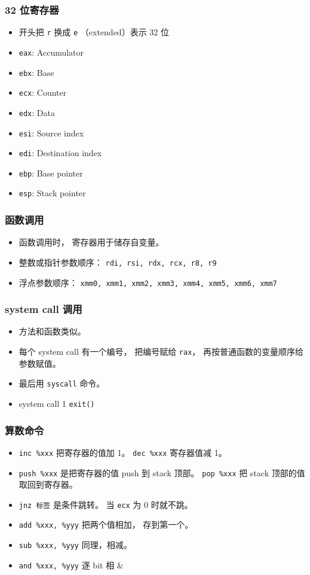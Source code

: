 \subsubsection{32 位寄存器}
\begin{itemize}
\item 开头把 \verb|r| 换成 \verb|e| （extended）表示 32 位
\item \verb|eax|: Accumulator
\item \verb|ebx|: Base
\item \verb|ecx|: Counter
\item \verb|edx|: Data
\item \verb|esi|: Source index
\item \verb|edi|: Destination index
\item \verb|ebp|: Base pointer
\item \verb|esp|: Stack pointer
\end{itemize}

\subsubsection{函数调用}
\begin{itemize}
\item 函数调用时， 寄存器用于储存自变量。
\item 整数或指针参数顺序： \verb|rdi, rsi, rdx, rcx, r8, r9|
\item 浮点参数顺序： \verb|xmm0, xmm1, xmm2, xmm3, xmm4, xmm5, xmm6, xmm7|
\end{itemize}

\subsubsection{system call 调用}
\begin{itemize}
\item 方法和函数类似。
\item 每个 system call 有一个编号， 把编号赋给 \verb|rax|， 再按普通函数的变量顺序给参数赋值。
\item 最后用 \verb|syscall| 命令。
\item system call 1 \verb|exit()|
\end{itemize}

\subsubsection{算数命令}
\begin{itemize}
\item \verb|inc %xxx| 把寄存器的值加 1。 \verb|dec %xxx| 寄存器值减 1。
\item \verb|push %xxx| 是把寄存器的值 push 到 stack 顶部。 \verb|pop %xxx| 把 stack 顶部的值取回到寄存器。
\item \verb|jnz 标签| 是条件跳转。 当 \verb|ecx| 为 0 时就不跳。
\item \verb|add %xxx, %yyy| 把两个值相加， 存到第一个。
\item \verb|sub %xxx, %yyy| 同理，相减。
\item \verb|and %xxx, %yyy| 逐 bit 相 \&
\end{itemize}

